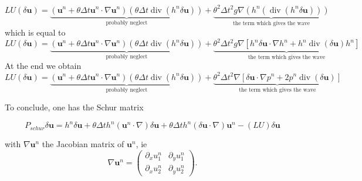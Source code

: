 \documentclass[a4paper, 11pt]{article}
\begin{document}
\begin{equation*}
LU(\delta \boldsymbol{u})=\underbrace{\left(\boldsymbol{u}^n+\theta \Delta t \boldsymbol{u}^n\cdot \nabla \boldsymbol{u}^n \right)\left(\theta \Delta t \operatorname{div}(h^n \delta \boldsymbol{u})\right)}_\textrm{probably neglect}
+\underbrace{\theta^2 \Delta t^2 g\nabla\left( h^n\left(\operatorname{div}(h^n\delta  \boldsymbol{u})\right)\right)}_\textrm{the term which gives the wave}
\end{equation*}
which is equal to
\begin{equation*}
LU(\delta \boldsymbol{u})=\underbrace{\left(\boldsymbol{u}^n+\theta \Delta t \boldsymbol{u}^n\cdot \nabla \boldsymbol{u}^n \right)\left(\theta \Delta t \operatorname{div}(h^n \delta \boldsymbol{u})\right)}_\textrm{probably neglect}
+\underbrace{\theta^2 \Delta t^2 g\nabla\left[ h^n \delta \boldsymbol{u}\cdot \nabla h^n + h^n \operatorname{div}(\delta \boldsymbol{u})h^n \right]}_\textrm{the term which gives the wave}
\end{equation*}
At the end we obtain
\begin{equation*}
LU(\delta \boldsymbol{u})=\underbrace{\left(\boldsymbol{u}^n+\theta \Delta t \boldsymbol{u}^n\cdot \nabla \boldsymbol{u}^n \right)\left(\theta \Delta t \operatorname{div}(h^n \delta \boldsymbol{u})\right)}_\textrm{probably neglect}
+\underbrace{\theta^2 \Delta t^2 \nabla\left[ \delta \boldsymbol{u}\cdot \nabla p^n + 2p^n \operatorname{div}(\delta \boldsymbol{u}) \right]}_\textrm{the term which gives the wave}
\end{equation*}

To conclude, one has the Schur matrix 
\begin{small}
\begin{equation*}
P_{schur}\delta \boldsymbol{u}=h^n \delta \boldsymbol{u}+\theta\Delta th^n\left(\boldsymbol{u}^n\cdot\nabla\right)\delta \boldsymbol{u}+\theta\Delta th^n\left(\delta \boldsymbol{u} \cdot\nabla\right)\boldsymbol{u}^n-(LU)\delta \boldsymbol{u}
\end{equation*}
\end{small}
with $\nabla\boldsymbol{u}^n$ the Jacobian matrix of $\boldsymbol{u}^n$, ie
\begin{equation*}
\nabla\boldsymbol{u}^n=
\begin{pmatrix}
\partial_x u_1^n &\partial_y u_1^n\\ \partial_x u_2^n &\partial_y u_2^n
\end{pmatrix}.
\end{equation*}
\end{document}

